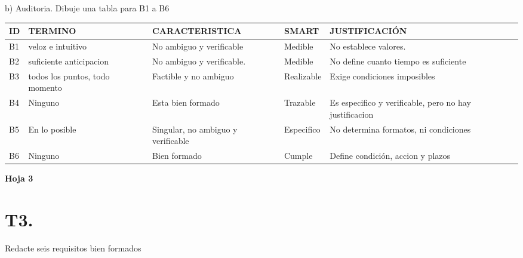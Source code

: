 \documentclass[conference,onecolumn]{IEEEtran}
\begin{document}
\noindent b) Auditoria. Dibuje una tabla para B1 a B6

{\small
\begin{longtable}{@{}L{0.05\textwidth}L{0.16\textwidth}L{0.22\textwidth}L{0.13\textwidth}L{0.36\textwidth}@{}}
\toprule
\textbf{ID} & \textbf{TERMINO} & \textbf{CARACTERISTICA} & \textbf{SMART} & \textbf{JUSTIFICACIÓN}\\
\midrule
\endhead
B1 & veloz e intuitivo & No ambiguo y verificable & Medible & No establece valores.\\
B2 & suficiente anticipacion & No ambiguo y verificable. & Medible & No define cuanto tiempo es suficiente\\
B3 & todos los puntos, todo momento & Factible y no ambiguo & Realizable & Exige condiciones imposibles\\
B4 & Ninguno & Esta bien formado & Trazable & Es especifico y verificable, pero no hay justificacion\\
B5 & En lo posible & Singular, no ambiguo y verificable & Especifico & No determina formatos, ni condiciones\\
B6 & Ninguno & Bien formado & Cumple & Define condición, accion y plazos\\
\bottomrule
\end{longtable}
}

\noindent\textbf{Hoja 3}

\section*{T3.}

\noindent Redacte seis requisitos bien formados
\end{document}
